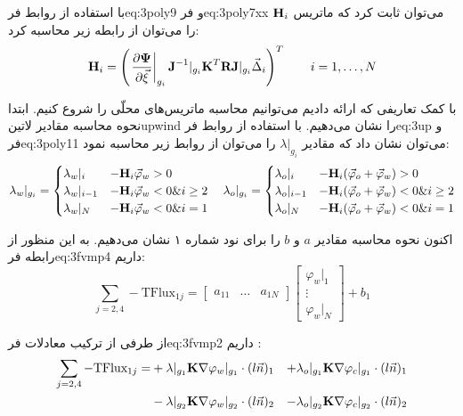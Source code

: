 با استفاده از روابط ‌فر{eq:3poly9} و ‌فر{eq:3poly7xx} می‌توان ثابت کرد که ماتریس $\textbf H_i$ را می‌توان از رابطه زیر محاسبه کرد:
\begin{equation}
\label{eq:3poly12}
\textbf H_i = \left( 
\left. \frac{\partial \mathbf \Psi}{\partial \vec \xi} \right|_{g_i} 
 \textbf J^{-1}|_{g_i} \textbf K^T \textbf R  \textbf J|_{g_i} \vec \Delta_i
 \right)^T
\qquad i = 1,\ldots,N
\end{equation}

با کمک تعاریفی که ارائه دادیم می‌توانیم محاسبه ماتریس‌های محلّی را شروع کنیم. ابتدا نحوه محاسبه مقادیر ‌لاتین{upwind} را نشان می‌دهیم. با استفاده از روابط ‌فر{eq:3up} و ‌فر{eq:3poly11} می‌توان نشان داد که مقادیر $\lambda|_{g_i}$ را  می‌توان از روابط زیر محاسبه نمود:
\begin{equation}
\label{eq:3poly13}
\lambda_w|_{g_i} = 
	\begin{cases}
	\lambda_w|_i &-\textbf H_i \vec \varphi_w > 0 \\	
	\lambda_w|_{i-1} &-\textbf H_i \vec \varphi_w < 0 \& i \geq 2 \\	
	\lambda_w|_N &-\textbf H_i \vec \varphi_w < 0 	\& i = 1	
	\end{cases} \quad
\lambda_o|_{g_i} = 
	\begin{cases}
	\lambda_o|_i &-\textbf H_i  (\vec \varphi_o + \vec \varphi_w) > 0 \\	
	\lambda_o|_{i-1} &-\textbf H_i  (\vec \varphi_o + \vec \varphi_w)<0 \& i \geq 2 \\	
	\lambda_o|_N &-\textbf H_i  (\vec \varphi_o + \vec \varphi_w)<0	\& i = 1	
	\end{cases}
\end{equation}

اکنون نحوه محاسبه مقادیر $a$ و $b$ را برای نود شماره ۱ نشان می‌دهیم. به این منظور از رابطه ‌فر{eq:3fvmp4} داریم:
\begin{equation}
\label{eq:3poly14}
\sum_{j=2,4} -\text{TFlux}_{1j} = 
\begin{bmatrix}
	a_{11} &\ldots &a_{1N} 
\end{bmatrix}
\begin{bmatrix}
	\varphi_w|_1 \\ \vdots \\ \varphi_w|_N
\end{bmatrix}
+ b_1
\end{equation}

از طرفی از ترکیب معادلات  ‌فر{eq:3fvmp2}  داریم :
\begin{equation}
\label{eq:3poly15}
\begin{aligned}
\sum_{j=2,4} -\text{TFlux}_{1j} = 
&+\lambda|_{g_1} \textbf K \nabla \varphi_w|_{g_1} \cdot (l\vec n)_1 
&+\lambda_o|_{g_1} \textbf K \nabla \varphi_c|_{g_1} \cdot (l\vec n)_1 \\
&-\lambda|_{g_2} \textbf K \nabla \varphi_w|_{g_2} \cdot (l\vec n)_2 
&-\lambda_o|_{g_2} \textbf K \nabla \varphi_c|_{g_2} \cdot (l\vec n)_2 \\
\end{aligned} 
\end{equation}

